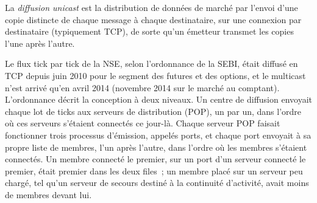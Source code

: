 \begin{definition}\label{def:nw:the-asia-pacific-map:unicast}
La \emph{diffusion unicast} est la distribution de données de marché par l'envoi d'une copie distincte de chaque message à
chaque destinataire, sur une connexion par destinataire (typiquement TCP), de sorte qu'un émetteur transmet les copies l'une après l'autre.
\end{definition}

Le flux tick par tick de la NSE, selon l'ordonnance de la SEBI, était diffusé en TCP depuis juin 2010 pour le segment des futures et des options, et
le multicast n'est arrivé qu'en avril 2014 (novembre 2014 sur le marché au comptant). L'ordonnance décrit la conception à deux niveaux. Un centre de diffusion
envoyait chaque lot de ticks aux serveurs de distribution (POP), un par un, dans l'ordre où ces serveurs s'étaient connectés
ce jour-là. Chaque serveur POP faisait fonctionner trois processus d'émission, appelés ports, et chaque port envoyait à sa propre liste de membres, l'un après l'autre, dans l'ordre
où les membres s'étaient connectés. Un membre connecté le premier, sur un port d'un serveur connecté le premier, était premier dans
les deux files~; un membre placé sur un serveur peu chargé, tel qu'un serveur de secours destiné à la continuité d'activité, avait moins de membres devant lui.

